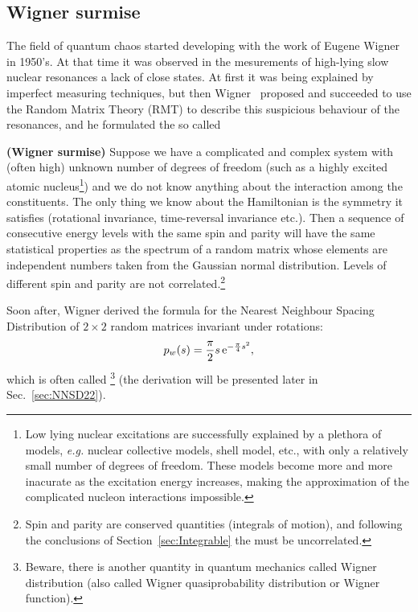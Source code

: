 \documentclass[a4paper,11pt,twoside]{article}
\begin{document}
    \subsection{Wigner surmise}\label{sec:Wigner}
        The field of quantum chaos started developing with the work of Eugene Wigner in 1950's. 
        At that time it was observed in the mesurements of high-lying slow nuclear resonances a lack of close states.
        At first it was being explained by imperfect measuring techniques, but then Wigner~\cite{Wig55} proposed and succeeded to use the Random Matrix Theory (RMT) to describe this suspicious behaviour of the resonances, and he formulated the so called
        \begin{theorem}
            {\bf (Wigner surmise)}
            Suppose we have a complicated and complex system with (often high) unknown number of degrees of freedom (such as a highly excited atomic nucleus\footnote{
                Low lying nuclear excitations are successfully explained by a plethora of models, \emph{e.g.} nuclear collective models, shell model, etc., with only a relatively small number of degrees of freedom.
                These models become more and more inacurate as the excitation energy increases, making the approximation of the complicated nucleon interactions impossible.})
            and we do not know anything about the interaction among the constituents.
            The only thing we know about the Hamiltonian is the symmetry it satisfies (rotational invariance, time-reversal invariance etc.).
            Then a sequence of consecutive energy levels with the same spin and parity will have the same statistical properties as the spectrum of a random matrix whose elements are independent numbers taken from the Gaussian normal distribution.
            Levels of different spin and parity are not correlated.\footnote{Spin and parity are conserved quantities (integrals of motion), and following the conclusions of Section~\ref{sec:Integrable} the must be uncorrelated.}
        \end{theorem}
        Soon after, Wigner derived the formula for the Nearest Neighbour Spacing Distribution of $2\times2$ random matrices invariant under rotations:
        \begin{equation}
            \label{eq:Wigner}
            p_{w}(s)=\frac{\pi}{2}s\operatorname{e}^{-\frac{\pi}{4}s^{2}},
        \end{equation}
        which is often called \footnote{Beware, there is another quantity in quantum mechanics called Wigner distribution (also called Wigner quasiprobability distribution or Wigner function).} (the derivation will be presented later in Sec.~\ref{sec:NNSD22}).
\end{document}
